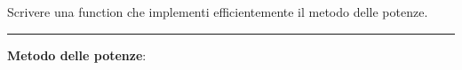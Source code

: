 Scrivere una function che implementi efficientemente il metodo delle potenze.

\hspace{1cm}
\par\noindent\rule{\textwidth}{0.4pt}
\hspace{1cm}

\textbf{Metodo delle potenze}:

